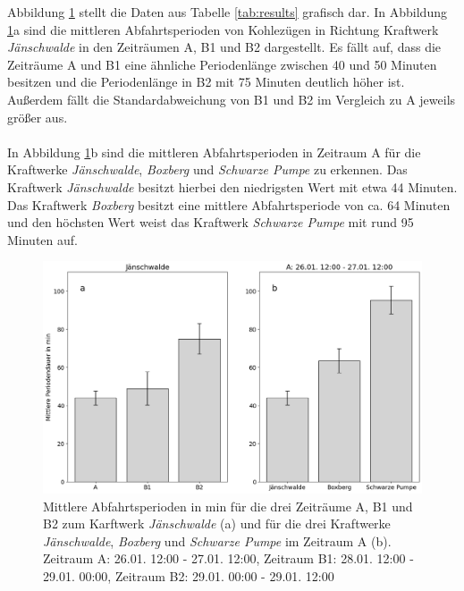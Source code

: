 Abbildung \ref{fig:results-periods} stellt die Daten aus Tabelle \ref{tab:results} grafisch dar. In Abbildung \ref{fig:results-periods}a sind die mittleren Abfahrtsperioden von Kohlezügen in Richtung Kraftwerk \emph{Jänschwalde} in den Zeiträumen A, B1 und B2 dargestellt. Es fällt auf, dass die Zeiträume A und B1 eine ähnliche Periodenlänge zwischen 40 und 50 Minuten besitzen und die Periodenlänge in B2 mit 75 Minuten deutlich höher ist. Außerdem fällt die Standardabweichung von B1 und B2 im Vergleich zu A jeweils größer aus.\\
\\
In Abbildung \ref{fig:results-periods}b sind die mittleren Abfahrtsperioden in Zeitraum A für die Kraftwerke \emph{Jänschwalde}, \emph{Boxberg} und \emph{Schwarze Pumpe} zu erkennen. Das Kraftwerk \emph{Jänschwalde} besitzt hierbei den niedrigsten Wert mit etwa 44 Minuten. Das Kraftwerk \emph{Boxberg} besitzt eine mittlere Abfahrtsperiode von ca. 64 Minuten und den höchsten Wert weist das Kraftwerk \emph{Schwarze Pumpe} mit rund 95 Minuten auf.

\begin{figure}[H]
	\centering
	\includegraphics[width=1.0\linewidth]{images/results/periods.png}
	\caption{Mittlere Abfahrtsperioden in min für die drei Zeiträume A, B1 und B2 zum Karftwerk \emph{Jänschwalde} (a) und für die drei Kraftwerke \emph{Jänschwalde}, \emph{Boxberg} und \emph{Schwarze Pumpe} im Zeitraum A (b). Zeitraum A: 26.01. 12:00 - 27.01. 12:00, Zeitraum B1: 28.01. 12:00 - 29.01. 00:00, Zeitraum B2: 29.01. 00:00 - 29.01. 12:00}
	\label{fig:results-periods}
\end{figure}


